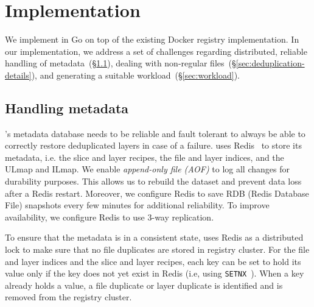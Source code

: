 \section{Implementation}
\label{sec:impl}

We implement \sysname in Go on top of the existing Docker registry implementation. In our implementation,
we address a set of challenges regarding distributed, reliable handling of
metadata~(\S\ref{sec:handling-metadata}), dealing with non-regular files~(\S\ref{sec:deduplication-details}),
and generating a suitable workload~(\S\ref{sec:workload}).

\subsection{Handling metadata}
\label{sec:handling-metadata}

\sysname{}'s metadata database needs to be reliable and fault tolerant to always be
able to correctly restore deduplicated layers in case of a failure.
%
\sysname uses Redis~\cite{redis} to store its metadata, i.e.
the slice and layer recipes, the file and layer indices, and the ULmap and ILmap.
%
We enable \emph{append-only file (AOF)} to log all changes for durability purposes.
This allows us to rebuild the dataset and prevent data loss after a Redis restart.
%
Moreover, we configure Redis to save RDB (Redis Database File) snapshots every few minutes for additional
reliability. To improve availability, we configure Redis to use 3-way replication.


%
To ensure that the metadata is in a consistent state, \sysname uses Redis as a distributed
lock to make sure that no file duplicates are stored in registry cluster.
%
For the file and layer indices and the slice and layer recipes,
each key can be set to hold its value only if
the key does not yet exist in Redis (i.e, using \texttt{SETNX}~\cite{SETNX}).
%
When a key already holds a value, a file duplicate or
layer duplicate is identified and is removed from the registry cluster.

